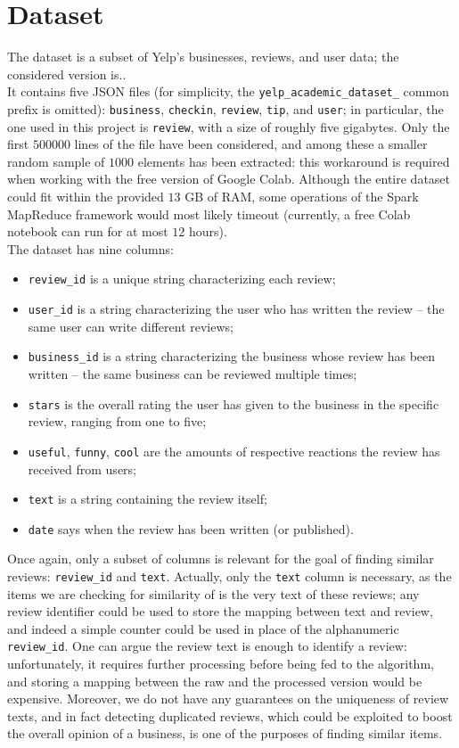 \documentclass{article}
\begin{document}
  \newpage

  \section{Dataset}
  The dataset is a subset of Yelp's businesses, reviews, and user data; the
  considered version is.. \\
  It contains five JSON files (for simplicity, the
  \texttt{yelp\_academic\_dataset\_} common prefix is omitted):
  \texttt{business}, \texttt{checkin}, \texttt{review}, \texttt{tip}, and
  \texttt{user}; in particular, the one used in this project is
  \texttt{review}, with a size of roughly five gigabytes. Only the first
  \( 500000 \) lines of the file have been considered, and among these a
  smaller random sample of \( 1000 \) elements has been extracted: this
  workaround is required when working with the free version of Google Colab.
  Although the entire dataset could fit within the provided \( 13 \) GB of RAM,
  some operations of the Spark MapReduce framework would most likely timeout
  (currently, a free Colab notebook can run for at most \( 12 \) hours). \\
  The dataset has nine columns:
  \begin{itemize}
    \item \texttt{review\_id} is a unique string characterizing each review;
    \item \texttt{user\_id} is a string characterizing the user who has written
    the review – the same user can write different reviews;
    \item \texttt{business\_id} is a string characterizing the business whose
    review has been written – the same business can be reviewed multiple times;
    \item \texttt{stars} is the overall rating the user has given to the
    business in the specific review, ranging from one to five;
    \item \texttt{useful}, \texttt{funny}, \texttt{cool} are the amounts of
    respective reactions the review has received from users;
    \item \texttt{text} is a string containing the review itself;
    \item \texttt{date} says when the review has been written (or published).
  \end{itemize}
  Once again, only a subset of columns is relevant for the goal of finding
  similar reviews: \texttt{review\_id} and \texttt{text}. Actually, only the
  \texttt{text} column is necessary, as the items we are checking for
  similarity of is the very text of these reviews; any review identifier could
  be used to store the mapping between text and review, and indeed a simple
  counter could be used in place of the alphanumeric \texttt{review\_id}. One
  can argue the review text is enough to identify a review: unfortunately, it
  requires further processing before being fed to the algorithm, and storing a
  mapping between the raw and the processed version would be expensive.
  Moreover, we do not have any guarantees on the uniqueness of review texts,
  and in fact detecting duplicated reviews, which could be exploited to boost
  the overall opinion of a business, is one of the purposes of finding similar
  items.
\end{document}
